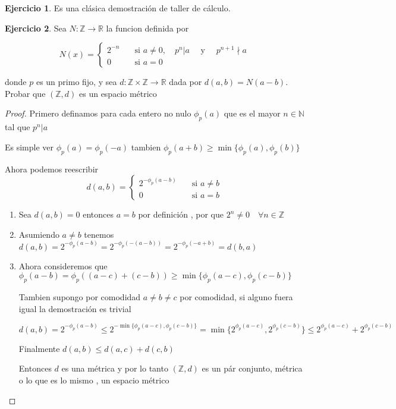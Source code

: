 \documentclass[12pt]{article}
\newcommand{\R}{\mathbb{R}}
\newcommand{\Z}{\mathbb{Z}}
\newcommand{\N}{\mathbb{N}}
\newcommand{\ra}{\rightarrow}
\theoremstyle{definition}
\newtheorem{ej}{Ejercicio}
\begin{document}
\begin{ej}
  Es una clásica demostración de taller de cálculo.
\end{ej}

\begin{ej}
  Sea $N : \Z \ra \R$ la funcion definida por 

$$
N(x) = \left\{
        \begin{array}{ll}
	  2^{-n} & \quad \text{si } a \neq 0, \quad p^n | a \quad  \text{ y } \quad p^{n+1} \nmid a  \\
	  0 & \quad \text{si } a = 0
        \end{array}
    \right.
$$

\noindent donde $p$ es un primo fijo, y sea $d:\Z \times \Z \ra \R$ dada por $d(a,b) = N(a-b)$. Probar que $(\Z ,d)$ es un espacio métrico

\begin{proof}
  Primero definamos para cada entero no nulo $\phi_{p}(a)$ que es el mayor $n \in \N$ tal que $p^n |a $

  Es simple ver $\phi_{p}(a) = \phi_{p}(-a)$ tambien $\phi_{p}(a + b) \geq \min{\{\phi_{p}(a),\phi_{p}(b)}\}$

  Ahora podemos reescribir
$$
d(a,b) = \left\{
        \begin{array}{ll}
	  2^{-\phi_{p}(a-b)} & \quad \text{si } a \neq b  \\
	  0 & \quad \text{si } a = b
        \end{array}
    \right.
$$

\begin{enumerate}
  \item Sea $d(a,b) = 0$ entonces $a =b $ por definición , por que $2^n \neq 0 \quad \forall n \in \Z$
  \item Asumiendo $a \neq b$ tenemos $d(a,b) = 2^{-\phi_{p}(a-b)} = 2^{-\phi_{p}(-(a-b))} = 2^{-\phi_{p}(-a+b)}= d(b,a)$
  \item Ahora consideremos que $\phi_{p}(a - b) = \phi_{p}((a-c) + (c - b)) \geq \min{\{\phi_{p}(a-c) ,\phi_{p}(c-b)\}}$

    Tambien supongo por comodidad $a \neq b \neq c$ por comodidad, si alguno fuera igual la demostración es trivial

    \noindent $d(a,b) = 2^{-\phi_{p}(a-b)} \leq 2^{-\min{   \{\phi_{p}(a-c) ,\phi_{p}(c-b) \}}} = \min{ \{     2^{\phi_{p}(a-c)} ,2^{\phi_{p}(c-b)} \} } \leq 2^{\phi_{p}(a-c)}  + 2^{\phi_{p}(c-b)}$ 

    Finalmente $d(a,b) \leq d(a,c) + d(c,b)$

    Entonces $d$ es una métrica y por lo tanto $(\Z, d)$ es un pár conjunto, métrica o lo que es lo mismo , un espacio métrico
\end{enumerate}
\end{proof}
\end{ej}
\end{document}
